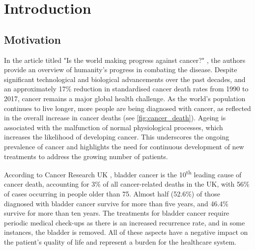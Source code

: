 
\chapter{Introduction}

\vspace{3mm}
\vspace{3mm}


\section{Motivation}


In the article titled "Is the world making progress against cancer?" \citep{Roser2015-qb}, the authors provide an overview of humanity's progress in combating the disease. Despite significant technological and biological advancements over the past decades, and an approximately 17\% reduction in standardised cancer death rates from 1990 to 2017, cancer remains a major global health challenge. As the world’s population continues to live longer, more people are being diagnosed with cancer, as reflected in the overall increase in cancer deaths (see \cref{fig:cancer_death}). Ageing is associated with the malfunction of normal physiological processes, which increases the likelihood of developing cancer. This underscores the ongoing prevalence of cancer and highlights the need for continuous development of new treatments to address the growing number of patients.


According to Cancer Research UK \citeyearpar{Cancer_Research_UK2015-cf}, bladder cancer is the 10\textsuperscript{th} leading cause of cancer death, accounting for 3\% of all cancer-related deaths in the UK, with 56\% of cases occurring in people older than 75. Almost half (52.6\%) of those diagnosed with bladder cancer survive for more than five years, and 46.4\% survive for more than ten years. The treatments for bladder cancer require periodic medical check-ups as there is an increased recurrence rate, and in some instances, the bladder is removed. All of these aspects have a negative impact on the patient's quality of life and represent a burden for the healthcare system.

